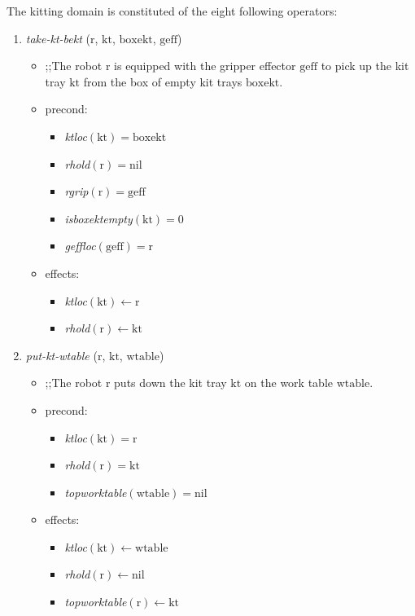 The kitting domain is constituted of the eight following operators:
\begin{small}
\begin{enumerate}
\item \textsl{take-kt-bekt} ($\mathrm{r}$, $\mathrm{kt}$, $\mathrm{boxekt}$, $\mathrm{geff}$)
\begin{itemize}
\item ;;The robot $\mathrm{r}$ is equipped with the gripper effector $\mathrm{geff}$ to pick up the kit tray $\mathrm{kt}$ from the box of empty kit trays $\mathrm{boxekt}$.
\item precond:
\begin{itemize}
\item[]\emph{ktloc}$\mathrm{(kt)=boxekt}$
\item[]\emph{rhold}$\mathrm{(r)=nil}$
\item[]\emph{rgrip}$\mathrm{(r)=geff}$
\item[]\emph{isboxektempty}$\mathrm{(kt)=0}$
\item[]\emph{geffloc}$\mathrm{(geff)=r}$
\end{itemize}
\item effects: 
\begin{itemize}
\item[]\emph{ktloc}$\mathrm{(kt)\leftarrow r}$
\item[]\emph{rhold}$\mathrm{(r)\leftarrow kt}$
\end{itemize}
\end{itemize}

\item \textsl{put-kt-wtable} ($\mathrm{r}$, $\mathrm{kt}$, $\mathrm{wtable}$)
\begin{itemize}
\item ;;The robot $\mathrm{r}$ puts down the kit tray $\mathrm{kt}$ on the work table $\mathrm{wtable}$.
\item precond:
\begin{itemize}
\item[]\emph{ktloc}$\mathrm{(kt)=r}$
\item[]\emph{rhold}$\mathrm{(r)=kt}$
\item[]\emph{topworktable}$\mathrm{(wtable)=nil}$
\end{itemize}
\item effects: 
\begin{itemize}
\item[]\emph{ktloc}$\mathrm{(kt)\leftarrow wtable}$
\item[]\emph{rhold}$\mathrm{(r)\leftarrow nil}$
\item[]\emph{topworktable}$\mathrm{(r)\leftarrow kt}$
\end{itemize}
\end{itemize}


\end{enumerate}
\end{small}
